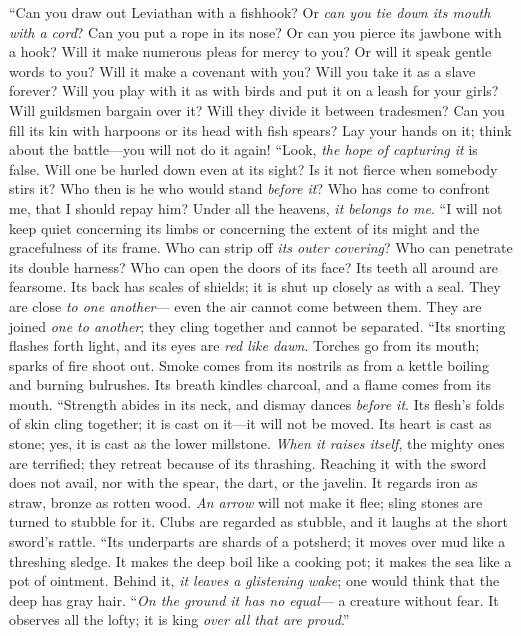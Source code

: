 \begin{biblechapter} %
\verse  “Can you draw out Leviathan with a fishhook? 
Or \textit{can you tie down its mouth with a cord}?
\verse Can you put a rope in its nose? 
Or can you pierce its jawbone with a hook?
\verse Will it make numerous pleas for mercy to you? 
Or will it speak gentle words to you?
\verse Will it make a covenant with you? 
Will you take it as a slave forever?
\verse Will you play with it as with birds 
and put it on a leash for your girls?
\verse Will guildsmen bargain over it? 
Will they divide it between tradesmen?
\verse Can you fill its kin with harpoons 
or its head with fish spears?
\verse Lay your hands on it; 
think about the battle—you will not do it again!
\verse “Look, \textit{the hope of capturing it} is false. 
Will one be hurled down even at its sight?
\verse Is it not fierce when somebody stirs it? 
Who then is he who would stand \textit{before it}?
\verse Who has come to confront me, that I should repay him? 
Under all the heavens, \textit{it belongs to me}.
\verse “I will not keep quiet concerning its limbs 
or concerning the extent of its might and the gracefulness of its frame.
\verse Who can strip off \textit{its outer covering}? 
Who can penetrate its double harness?
\verse Who can open the doors of its face? 
Its teeth all around are fearsome.
\verse Its back has scales of shields; 
it is shut up closely as with a seal.
\verse They are close \textit{to one another}— 
even the air cannot come between them.
\verse They are joined \textit{one to another}; 
they cling together and cannot be separated.
\verse “Its snorting flashes forth light, 
and its eyes are \textit{red like dawn}.
\verse Torches go from its mouth; 
sparks of fire shoot out.
\verse Smoke comes from its nostrils 
as from a kettle boiling and burning bulrushes.
\verse Its breath kindles charcoal, 
and a flame comes from its mouth.
\verse “Strength abides in its neck, 
and dismay dances \textit{before it}.
\verse Its flesh’s folds of skin cling together; 
it is cast on it—it will not be moved.
\verse Its heart is cast as stone; 
yes, it is cast as the lower millstone.
\verse \textit{When it raises itself}, the mighty ones are terrified; 
they retreat because of its thrashing.
\verse Reaching it with the sword does not avail, 
nor with the spear, the dart, or the javelin.
\verse It regards iron as straw, 
bronze as rotten wood.
\verse \textit{An arrow} will not make it flee; 
sling stones are turned to stubble for it.
\verse Clubs are regarded as stubble, 
and it laughs at the short sword’s rattle.
\verse “Its underparts are shards of a potsherd; 
it moves over mud like a threshing sledge.
\verse It makes the deep boil like a cooking pot; 
it makes the sea like a pot of ointment.
\verse Behind it, \textit{it leaves a glistening wake}; 
one would think that the deep has gray hair.
\verse “\textit{On the ground it has no equal}— 
a creature without fear.
\verse It observes all the lofty; 
it is king \textit{over all that are proud}.”
\end{biblechapter}

